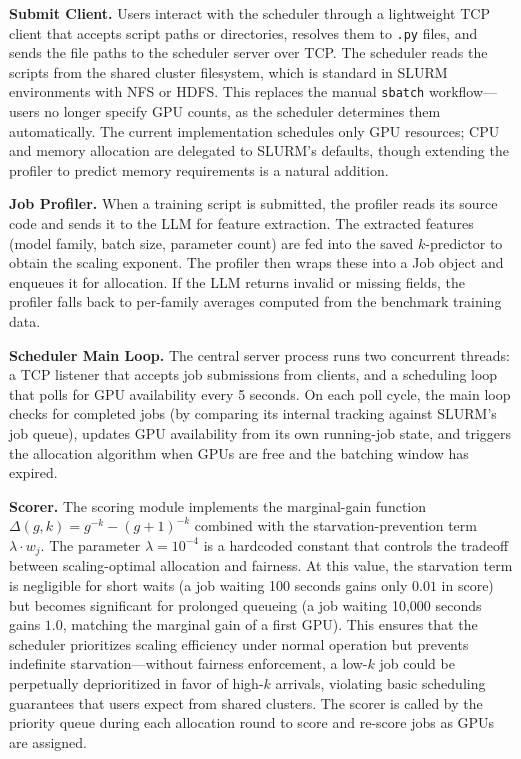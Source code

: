 \documentclass[letterpaper,10pt]{article}
\begin{document}
\textbf{Submit Client.} Users interact with the scheduler through a lightweight TCP client that accepts script paths or directories, resolves them to \texttt{.py} files, and sends the file paths to the scheduler server over TCP. The scheduler reads the scripts from the shared cluster filesystem, which is standard in SLURM environments with NFS or HDFS. This replaces the manual \texttt{sbatch} workflow---users no longer specify GPU counts, as the scheduler determines them automatically. The current implementation schedules only GPU resources; CPU and memory allocation are delegated to SLURM's defaults, though extending the profiler to predict memory requirements is a natural addition.

\textbf{Job Profiler.} When a training script is submitted, the profiler reads its source code and sends it to the LLM for feature extraction. The extracted features (model family, batch size, parameter count) are fed into the saved $k$-predictor to obtain the scaling exponent. The profiler then wraps these into a Job object and enqueues it for allocation. If the LLM returns invalid or missing fields, the profiler falls back to per-family averages computed from the benchmark training data.

\textbf{Scheduler Main Loop.} The central server process runs two concurrent threads: a TCP listener that accepts job submissions from clients, and a scheduling loop that polls for GPU availability every 5 seconds. On each poll cycle, the main loop checks for completed jobs (by comparing its internal tracking against SLURM's job queue), updates GPU availability from its own running-job state, and triggers the allocation algorithm when GPUs are free and the batching window has expired.

\textbf{Scorer.} The scoring module implements the marginal-gain function $\Delta(g, k) = g^{-k} - (g+1)^{-k}$ combined with the starvation-prevention term $\lambda \cdot w_j$. The parameter $\lambda = 10^{-4}$ is a hardcoded constant that controls the tradeoff between scaling-optimal allocation and fairness. At this value, the starvation term is negligible for short waits (a job waiting 100 seconds gains only $0.01$ in score) but becomes significant for prolonged queueing (a job waiting 10{,}000 seconds gains $1.0$, matching the marginal gain of a first GPU). This ensures that the scheduler prioritizes scaling efficiency under normal operation but prevents indefinite starvation---without fairness enforcement, a low-$k$ job could be perpetually deprioritized in favor of high-$k$ arrivals, violating basic scheduling guarantees that users expect from shared clusters. The scorer is called by the priority queue during each allocation round to score and re-score jobs as GPUs are assigned.
\end{document}

